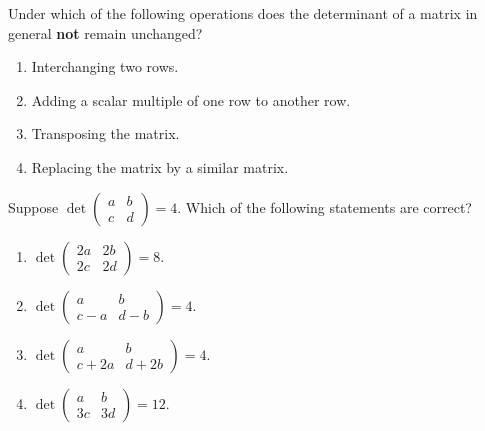 \begin{exercise}
  \label{exc:invariance_under_matrix_operations_sc}
  Under which of the following operations does the determinant of a matrix in general \textbf{not} remain unchanged?
  \begin{enumerate}[label=\textbf{(\alph*)}]
    \item Interchanging two rows.
    \item Adding a scalar multiple of one row to another row.
    \item Transposing the matrix.
    \item Replacing the matrix by a similar matrix.
  \end{enumerate}
\end{exercise}

\begin{exercise}
  \label{exc:row_transformations_2x2_mc}
  Suppose $\det \left(\begin{smallmatrix} a & b \\ c & d \end{smallmatrix}\right) = 4$. Which of the following statements are correct?
  \begin{enumerate}[label=\textbf{(\alph*)}]
    \item $\det \left(\begin{smallmatrix} 2a & 2b \\ 2c & 2d \end{smallmatrix}\right) = 8$.
    \item $\det \left(\begin{smallmatrix} a & b \\ c-a & d-b \end{smallmatrix}\right) = 4$.
    \item $\det \left(\begin{smallmatrix} a & b \\ c+2a & d+2b \end{smallmatrix}\right) = 4$.
    \item $\det \left(\begin{smallmatrix} a & b \\ 3c & 3d \end{smallmatrix}\right) = 12$.
  \end{enumerate}
\end{exercise}

